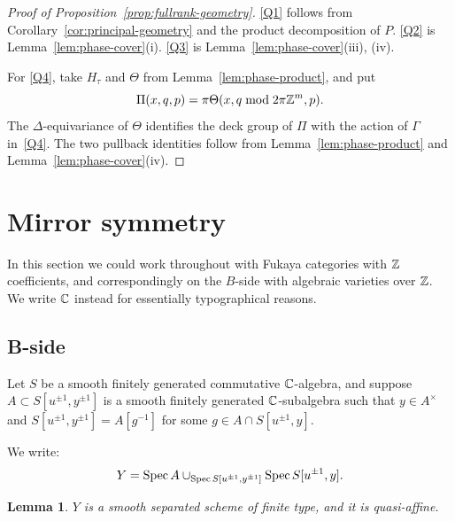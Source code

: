 \documentclass[12pt, letter]{amsart}
\newtheorem{lemma}[dummy]{Lemma}
\theoremstyle{definition}
\begin{document}
\begin{proof}[Proof of Proposition~\ref{prop:fullrank-geometry}]
\ref{Q1} follows from Corollary~\ref{cor:principal-geometry} and the product decomposition of $P$.
\ref{Q2} is Lemma~\ref{lem:phase-cover}(i).
\ref{Q3} is Lemma~\ref{lem:phase-cover}(iii), (iv).

For \ref{Q4}, take $H_\tau$ and $\Theta$ from Lemma~\ref{lem:phase-product}, and put
\[
 \Pi(x,q,p)=\pi\Theta(x,q\bmod2\pi\mathbb{Z}^m,p).
\]
The $\Delta$-equivariance of $\Theta$ identifies the deck group of $\Pi$ with the action of $\Gamma$ in~\ref{Q4}.
The two pullback identities follow from Lemma~\ref{lem:phase-product} and Lemma~\ref{lem:phase-cover}(iv).
\end{proof}





















\section{Mirror symmetry}

In this section we could work throughout with Fukaya categories with $\mathbb{Z}$ coefficients, and correspondingly on the $B$-side with algebraic varieties over $\mathbb{Z}$.  We write $\mathbb C$ instead for essentially typographical reasons. 

\subsection{B-side}



Let $S$  be  a smooth finitely generated commutative $\mathbb{C}$-algebra, and 
suppose $A \subset S[u^{\pm 1}, y^{\pm 1}]$ is a smooth finitely generated $\mathbb C$-subalgebra such that $y \in A^\times$ and $S[u^{\pm 1}, y^{\pm 1}] = A[g^{-1}]$ for some $g \in A \cap S[u^{\pm 1}, y]$.




We write: 
\[ Y=\operatorname{Spec} A\cup_{\operatorname{Spec} S[u^{\pm 1}, y^{\pm 1}]} \operatorname{Spec} S[u^{\pm 1}, y].
\]
\begin{lemma}
\label{lem:Y}
$Y$ is a smooth separated scheme of finite type, and it is quasi-affine.
\end{lemma}
\end{document}
